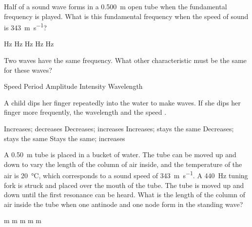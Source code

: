 \documentclass{../../../oss-ap12ibhl-print}
\begin{document}
\begin{questions}
  \question Half of a sound wave forms in a \SI{.500}{\metre} open tube when the
  fundamental frequency is played. What is this fundamental frequency when the
  speed of sound is \SI{343}{\metre\per\second}?
  \begin{choices}
     Hz
     Hz
     Hz
     Hz
     Hz
  \end{choices}
    
  \question Two waves have the same frequency. What other characteristic must be
  the same for these waves?
  \begin{choices}
    \choice Speed
    \choice Period
    \choice Amplitude
    \choice Intensity
    \choice Wavelength
  \end{choices}

  \question A child dips her finger repeatedly into the water to make waves. If
  she dips her finger more frequently, the wavelength \underline{\hspace{.3in}}
  and the speed \underline{\hspace{.3in}}.
  \begin{choices}
    \choice Increases; decreases
    \choice Decreases; increases
    \choice Increases; stays the same
    \choice Decreases; stays the same
    \choice Stays the same; increases
  \end{choices}
    
  \question A \SI{.50}{\metre} tube is placed in a bucket of water. The tube
  can be moved up and down to vary the length of the column of air inside, and
  the temperature of the air is \SI{20}{\celsius}, which corresponds to a sound
  speed of \SI{343}{\metre\per\second}. A \SI{440}{\hertz} tuning fork is
  struck and placed over the mouth of the tube. The tube is moved up and down
  until the first resonance can be heard. What is the length of the column of
  air inside the tube when one antinode and one node form in the standing wave?
  \begin{choices}
     m
     m
     m
     m
     m
  \end{choices}
  \newpage



\end{questions}
\end{document}
